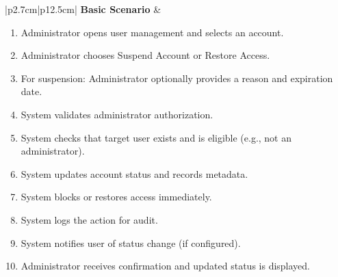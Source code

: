 \begin{table}[H]
\begin{tabular}{|p{2.7cm}|p{12.5cm}|}
        \textbf{Basic Scenario} & \begin{minipage}[t]{\linewidth}
                                      \begin{enumerate}[topsep=0pt,itemsep=1pt,parsep=0pt,partopsep=0pt]
                                          \item Administrator opens user management and selects an account.
                                          \item Administrator chooses Suspend Account or Restore Access.
                                          \item For suspension: Administrator optionally provides a reason and expiration date.
                                          \item System validates administrator authorization.
                                          \item System checks that target user exists and is eligible (e.g., not an administrator).
                                          \item System updates account status and records metadata.
                                          \item System blocks or restores access immediately.
                                          \item System logs the action for audit.
                                          \item System notifies user of status change (if configured).
                                          \item Administrator receives confirmation and updated status is displayed.
                                      \end{enumerate}
                                  \end{minipage} \\ \hline
        

\end{tabular}
\end{table}
